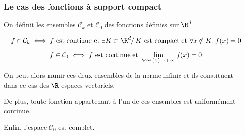 \subsubsection{Le cas des fonctions à support compact}

\begin{prop}
On définit les ensembles $\mathcal{C}_k$ et $\mathcal{C}_0$ des fonctions définies sur $\R^d$.

\[
f \in \mathcal{C}_k \iff f \text{ est continue et } \exists K \subset \R^d/ \, K \text{ est compact et }\forall x \notin K, \, f(x)=0
\]


\[
f \in \mathcal{C}_0 \iff f \text{ est continue et } \lim \limits_{\abs{x} \to +\infty} f(x)=0
\]

On peut alors munir ces deux ensembles de la norme infinie et ils constituent dans ce cas des $\R$-espaces vectoriels.

De plus, toute fonction appartenant à l'un de ces ensembles est uniformément continue.

Enfin, l'espace $\mathcal{C}_0$ est complet.
\end{prop}


